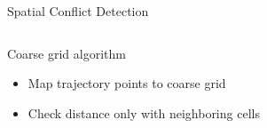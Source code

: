 \documentclass[10pt]{beamer}
\begin{document}
\begin{frame}[t]{Spatial Conflict Detection}
\begin{overprint}
\begin{columns}[t]
         {%
            \begin{block}{Coarse grid algorithm}
                \begin{itemize}
                    \item Map trajectory points to coarse grid
                \end{itemize} 
                \begin{center}
                \end{center}
                 {
                \vspace{-0.3cm}
                \begin{itemize}
                    \item Check distance only with neighboring cells
                \end{itemize} 
                }
            \end{block}
        }%
    \end{columns}
    \end{overprint}%
\end{frame}
\end{document}
